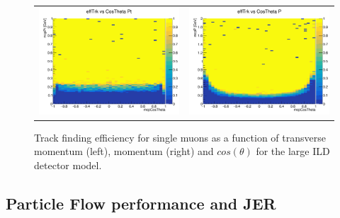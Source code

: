 %
% 
\begin{figure}[b!]
\begin{tabular}{cc}
\includegraphics[width=0.5\hsize]{Performance/fig/SingleMuon_EffTrk2DCosThetaPt.png} &
\includegraphics[width=0.5\hsize]{Performance/fig/SingleMuon_EffTrk2DCosThetaP.png}
\end{tabular}
\caption{\label{fig:perf:trkeff_2D_single}Track finding efficiency for single muons as a function of transverse momentum (left),
  momentum (right) and $cos(\theta)$ for the large ILD detector model.  }
 \end{figure}


\subsection{Particle Flow performance and JER}



